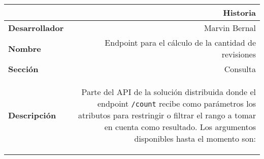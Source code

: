 
\renewcommand{\arraystretch}{1.5}
\begin{table}[H]
	\begin{center}
		\begin{tabular}{|l|r|}
			\hline
			\multicolumn{2}{|r|}{\textbf{Historia}} \\
			\hline
			\textbf{Desarrollador} & Marvin Bernal\\
			\hline
			\textbf{Nombre} & Endpoint para el cálculo de la cantidad de revisiones\\
			\hline
			\textbf{Sección} & Consulta\\
			\hline
			\textbf{Descripción} & \parbox[t]{3in}{Parte del API de la solución distribuida donde el endpoint \texttt{/count}
			recibe como parámetros los atributos para restringir o filtrar el
			rango a tomar en cuenta como resultado. Los argumentos
			disponibles hasta el momento son:\par
				\begin{itemize}


\end{itemize}}
\end{tabular}
\end{center}
\end{table}
